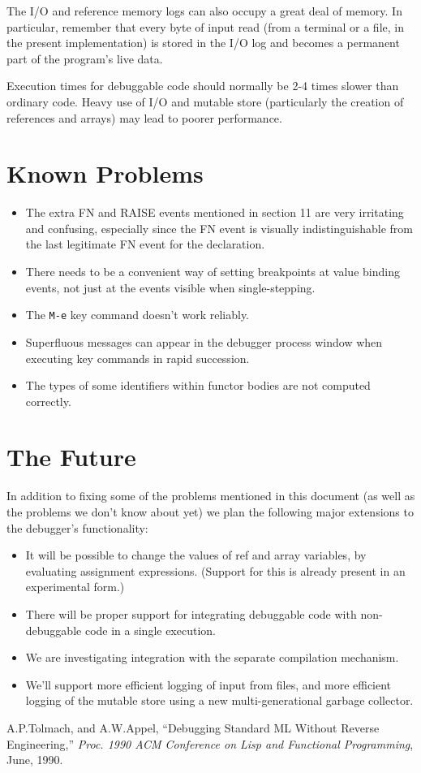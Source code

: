 The I/O and reference memory logs can also occupy a great deal of memory. In
particular, remember that every byte of input read (from a terminal or
a file, in the present implementation) is stored in the I/O log and 
becomes a permanent part of the program's live data.

Execution times for debuggable code should normally be 2-4 times slower than
ordinary code.  Heavy use of I/O and mutable store (particularly the creation
of references and arrays) may lead to poorer performance.

\section{Known Problems}

\begin{itemize}
\item The extra FN and RAISE events mentioned in section 11 are very 
irritating and confusing, especially since the FN event is visually
indistinguishable from the last legitimate FN event for the declaration.
\item There needs to be a convenient way of setting breakpoints at value
binding events, not just at the events visible when single-stepping.
\item The \verb'M-e' key command doesn't work reliably.
\item Superfluous messages can appear in the debugger process window 
when executing key commands in rapid succession.
\item The types of some identifiers within functor bodies are not
computed correctly.
\end{itemize}

\section{The Future}
In addition to fixing some of the problems mentioned in this document
(as well as the problems we don't know about yet) we plan the following
major extensions to the debugger's functionality:
\begin{itemize}
  \item It will be possible to change the values of ref and array variables, 
by evaluating assignment expressions.  (Support for this is already 
present in an experimental form.)
  \item There will be proper support for integrating debuggable code with 
non-debuggable code in a single execution.
  \item We are investigating integration with the separate compilation 
mechanism.
  \item We'll support more efficient logging of input from files, and more
efficient logging of the mutable store using a new multi-generational garbage
collector.
\end{itemize}

\begin{thebibliography}{9}
 A.P.Tolmach, and A.W.Appel, ``Debugging Standard ML Without
Reverse Engineering,'' {\em Proc. 1990 ACM Conference on Lisp and Functional
Programming}, June, 1990.
\end{thebibliography}


